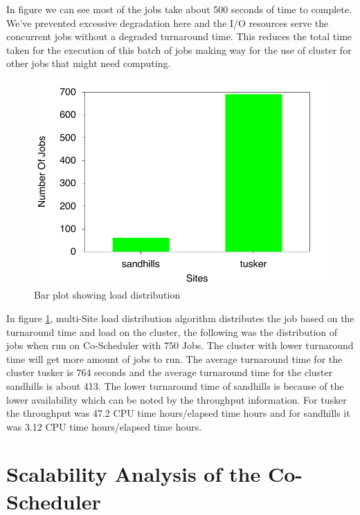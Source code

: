 \documentclass[ms,electronic,double]{nuthesis}
\begin{document}
In figure we can see most of the jobs take about 
500 seconds of time to complete. We've prevented excessive degradation here and 
the I/O resources serve the concurrent jobs without a degraded turnaround time. 
This reduces the total time taken for the execution of this batch of jobs 
making way for the use of cluster for other jobs that might need computing.


\begin{figure}[htbp!]
\begin{center}
\includegraphics{images/multisite_load}
\caption{Bar plot showing load distribution}
\label{fig:multisite_load}
\end{center}
\end{figure}
\FloatBarrier


In figure \ref{fig:multisite_load}, multi-Site load distribution algorithm distributes the job based on the 
turnaround time and load on the cluster, the following was the distribution of jobs when run 
on Co-Scheduler with 750 Jobs. The cluster with lower turnaround time will get more amount of jobs to run. The average turnaround time for 
the cluster tusker is 764 seconds and the average turnaround time for the 
cluster sandhills is about 413. The lower turnaround time of sandhills is 
because of the lower availability which can be noted by the throughput information. 
For tusker the throughput was 47.2 CPU time hours/elapsed time hours and for 
sandhills it was 3.12 CPU time hours/elapsed time hours.

\section{Scalability Analysis of the Co-Scheduler}
\end{document}
